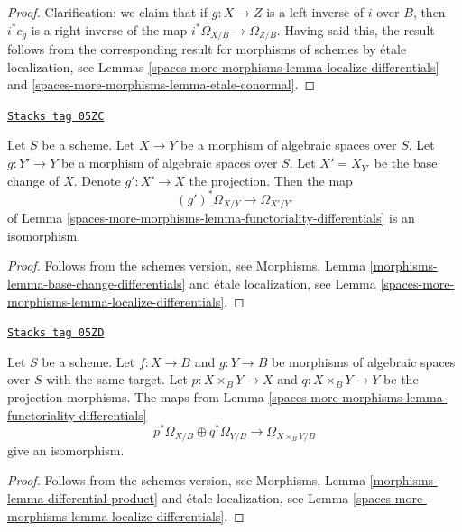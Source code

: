 \begin{proof}
Clarification: we claim that if $g : X \to Z$ is a left inverse of $i$
over $B$, then $i^*c_g$ is a right inverse of the map
$i^*\Omega_{X/B} \to \Omega_{Z/B}$.
Having said this, the result follows from the corresponding result for
morphisms of schemes by \'etale localization, see
Lemmas \ref{spaces-more-morphisms-lemma-localize-differentials} and
\ref{spaces-more-morphisms-lemma-etale-conormal}.
\end{proof}

\begin{lemma}
\label{spaces-more-morphisms-lemma-base-change-differentials}
\href{https://stacks.math.columbia.edu/tag/05ZC}{\texttt{Stacks tag 05ZC}}

Let $S$ be a scheme.
Let $X \to Y$ be a morphism of algebraic spaces over $S$.
Let $g : Y' \to Y$ be a morphism of algebraic spaces over $S$.
Let $X' = X_{Y'}$ be the base change of $X$.
Denote $g' : X' \to X$ the projection.
Then the map
$$
(g')^*\Omega_{X/Y} \to \Omega_{X'/Y'}
$$
of
Lemma \ref{spaces-more-morphisms-lemma-functoriality-differentials}
is an isomorphism.
\end{lemma}

\begin{proof}
Follows from the schemes version, see
Morphisms, Lemma \ref{morphisms-lemma-base-change-differentials}
and \'etale localization, see
Lemma \ref{spaces-more-morphisms-lemma-localize-differentials}.
\end{proof}

\begin{lemma}
\label{spaces-more-morphisms-lemma-differential-product}
\href{https://stacks.math.columbia.edu/tag/05ZD}{\texttt{Stacks tag 05ZD}}

Let $S$ be a scheme.
Let $f : X \to B$ and $g : Y \to B$ be morphisms of algebraic spaces
over $S$ with the same target.
Let $p : X \times_B Y \to X$ and $q : X \times_B Y \to Y$ be the
projection morphisms. The maps from
Lemma \ref{spaces-more-morphisms-lemma-functoriality-differentials}
$$
p^*\Omega_{X/B} \oplus q^*\Omega_{Y/B}
\longrightarrow
\Omega_{X \times_B Y/B}
$$
give an isomorphism.
\end{lemma}

\begin{proof}
Follows from the schemes version, see
Morphisms, Lemma \ref{morphisms-lemma-differential-product}
and \'etale localization, see
Lemma \ref{spaces-more-morphisms-lemma-localize-differentials}.
\end{proof}

